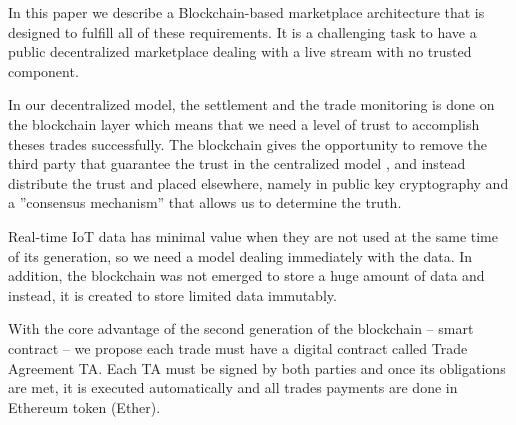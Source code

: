 \documentclass[letterpaper, 10 pt, conference]{ieeeconf}  %
\begin{document}
In this paper we describe a Blockchain-based marketplace architecture that is designed to fulfill all of these requirements. It is a challenging task to have a public decentralized marketplace dealing with a live stream with no trusted component.



 In our decentralized model, the settlement and the trade monitoring is done on the blockchain layer which means that we need a level of trust to accomplish theses trades successfully. The blockchain gives the opportunity to remove the third party that guarantee the trust in the centralized model , and instead distribute the trust and placed elsewhere, namely in public key cryptography and a ''consensus mechanism'' that allows us to determine the truth.

Real-time IoT data has minimal value when they are not used at the same time of its generation, so we need a model dealing immediately with the data. In addition, the blockchain was not emerged to store a huge amount of data and instead, it is created to store limited data immutably. 

With the core advantage of the second generation of the blockchain – smart contract – we propose each trade must have a digital contract called Trade Agreement TA. Each TA must be signed by both parties and once its obligations are met, it is executed automatically and all trades payments are done in Ethereum token (Ether).

\end{document}
